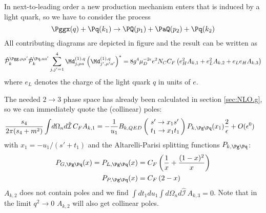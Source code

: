 In next-to-leading order a new production mechanism enters that is induced by a light quark, so we have to consider the process
\begin{equation}
\Pggx(q) + \Pq(k_1) \rightarrow \PQ(p_1)+\PaQ(p_2) + \Pq(k_2)
\end{equation}
All contributing diagrams are depicted in figure  and the result can be written as
\begin{equation}
\hat {\mathcal P}_{k}^{\Pgg,\mu\mu'}\hat {\mathcal P}_{k}^{\Pq,aa'}\sum_{j,j'=1}^4\Md^{(1),q}_{j,\mu a}\left(\Md^{(1),q}_{j',\mu' a'}\right)^* = 8g^4\mu_D^{-2\epsilon}e^2 N_C C_F\left( e_H^2 A_{k,1} +  e_L^2 A_{k,2} +  e_L e_H A_{k,3} \right)
\end{equation}
where $e_L$ denotes the charge of the light quark $q$ in units of $e$.

The needed $2\rightarrow 3$ phase space has already been calculated in section \ref{sec:NLO.g}, so we can immediately quote the (collinear) poles:
\begin{align}
\frac{s_4}{2\pi(s_4+m^2)}\int\!d\Omega_n d\hat{\mathcal I}\,C_F A_{k,1} &=-\frac 1 {u_1}B_{k,QED}\left(\!\begin{array}{l}s'\rightarrow x_1s'\\t_1\rightarrow x_1 t_1\end{array}\!\!\right) P_{k,\Pg\Pq}(x_1)\frac 2 \epsilon + O(\epsilon^0)
\end{align}
with $x_1 = -u_1/(s'+t_1)$ and the Altarelli-Parisi splitting functions $P_{k,\Pg\Pq}$\cite{Altarelli:1977zs,Vogelsang:1995vh}:
\begin{align}
P_{G,\Pg\Pq}(x) = P_{L,\Pg\Pq}(x) &= C_F\left(\frac 1 x + \frac {(1-x)^2} x\right) \label{eq:PGLgq} \\
P_{P,\Pg\Pq}(x) &= C_F\left(2-x\right) \label{eq:PPgq}
\end{align}
$A_{k,2}$ does not contain poles and we find $\int\!dt_1du_1\int\!d\Omega_n d\hat{\mathcal I}\,A_{k,3}=0$. Note that in the limit $q^2\rightarrow 0$ $A_{k,2}$ will also get collinear poles.
